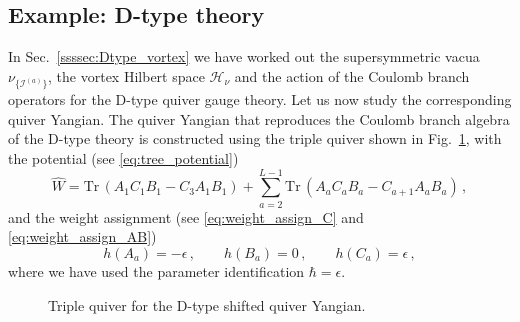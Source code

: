 \documentclass[12pt,a4paper]{article}
\renewcommand{\(}{\left(}
\renewcommand{\)}{\right)}
\renewcommand{\(}{\left(}
\renewcommand{\)}{\right)}
\begin{document}
\subsection{Example: D-type theory}\label{ssec:Dtype_theory}
In Sec.~\ref{ssssec:Dtype_vortex} we have worked out the supersymmetric vacua $\nu_{\{\mathcal{I}^{(a)}\}}$, the vortex Hilbert space $\mathcal{H}_\nu$ and the action of the Coulomb branch operators for the D-type quiver gauge theory.
Let us now study the corresponding quiver Yangian. 
The quiver Yangian that reproduces the Coulomb branch algebra of the D-type theory is constructed using the triple quiver shown in Fig.~\ref{fig:fig:Dtype_quiver_QY}, with the potential (see \eqref{eq:tree_potential})
\begin{equation}\label{eq:D_triple_superpotential}
\widehat{W}=\mathrm{Tr}\,(A_1C_1B_1-C_3A_1B_1)+\sum_{a=2}^{L-1}\mathrm{Tr}\,(A_aC_aB_a-C_{a+1}A_aB_a)\,,
\end{equation}
and the weight assignment (see \eqref{eq:weight_assign_C} and \eqref{eq:weight_assign_AB})
\begin{equation}
h(A_a)=-\epsilon\,,\qquad h(B_a)=0\,,\qquad h(C_a)=\epsilon\,,
\end{equation}
where we have used the parameter identification $\hbar=\epsilon$.
\begin{figure}[h]
\centering
{}
\caption{Triple quiver for the D-type shifted quiver Yangian.}
\label{fig:fig:Dtype_quiver_QY}
\end{figure}
\end{document}
